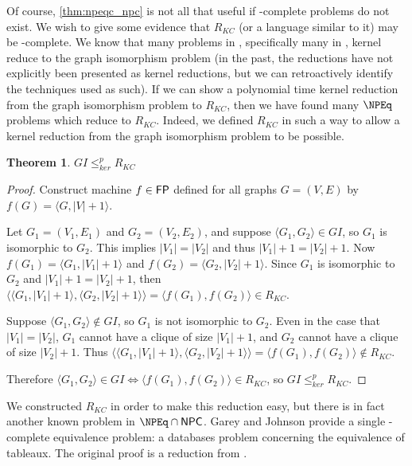 \documentclass{article}
\newtheorem{theorem}{Theorem}[section]
\theoremstyle{definition} \newtheorem{definition}[definition]{Definition}
\newcommand{\kr}{\leq^{p}_{ker}} %
\newcommand{\pair}[2]{\langle#1,#2\rangle} %
\begin{document}
Of course, \autoref{thm:npeqc_npc} is not all that useful if \NPEq-complete
problems do not exist. We wish to give some evidence that $R_{KC}$ (or a
language similar to it) may be \NPEq-complete. We know that many problems in
\NP, specifically many in \NPEq, kernel reduce to the graph isomorphism problem
(in the past, the reductions have not explicitly been presented as kernel
reductions, but we can retroactively identify the techniques used as such). If
we can show a polynomial time kernel reduction from the graph isomorphism
problem to $R_{KC}$, then we have found many $\NPEq$ problems which reduce to
$R_{KC}$. Indeed, we defined $R_{KC}$ in such a way to allow a kernel reduction
from the graph isomorphism problem to be possible.

\begin{theorem}$GI\kr R_{KC}$\end{theorem}
\begin{proof}
  Construct machine $f\in{\ensuremath{\mathsf{FP}}}$ defined for all graphs $G=(V,E)$ by
  $f(G)=\pair{G}{|V|+1}$.

  Let $G_1=(V_1, E_1)$ and $G_2=(V_2, E_2)$, and suppose $\pair{G_1}{G_2}\in
  GI$, so $G_1$ is isomorphic to $G_2$. This implies $|V_1|=|V_2|$ and thus
  $|V_1|+1=|V_2|+1$. Now $f(G_1)=\pair{G_1}{|V_1|+1}$ and $f(G_2)=\pair{G_2}{
  |V_2|+1}$. Since $G_1$ is isomorphic to $G_2$ and $|V_1|+1=|V_2|+1$, then
  $\pair{\pair{G_1}{|V_1|+1}}{\pair{G_2}{|V_2|+1}}=\pair{f(G_1)}{f(G_2)}\in
  R_{KC}$.
  
  Suppose $\pair{G_1}{G_2}\notin GI$, so $G_1$ is not isomorphic to $G_2$. Even
  in the case that $|V_1|=|V_2|$, $G_1$ cannot have a clique of size $|V_1|+1$,
  and $G_2$ cannot have a clique of size $|V_2|+1$. Thus
  $\pair{\pair{G_1}{|V_1|+1}}{\pair{G_2}{|V_2|+1}}=\pair{f(G_1)}{f(G_2)}\notin
  R_{KC}$.

  Therefore $\pair{G_1}{G_2}\in GI\iff \pair{f(G_1)}{f(G_2)}\in R_{KC}$, so
  $GI\kr R_{KC}$.
\end{proof}

We constructed $R_{KC}$ in order to make this reduction easy, but there is in
fact another known problem in $\NPEq\cap\NPC$. Garey and Johnson provide a
single \NP-complete equivalence problem: a databases problem concerning the
equivalence of tableaux.\cite{gj79} The original proof is a reduction from
\TSAT.\cite{asu79}
\end{document}

